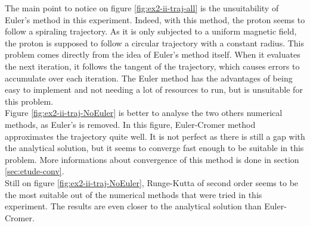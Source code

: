 \documentclass[a4paper,12pt,twoside]{article}
\begin{document}
The main point to notice on figure \ref{fig:ex2-ii-traj-all} is the unsuitability of Euler's method in this experiment.
Indeed, with this method, the proton seems to follow a spiraling trajectory.
As it is only subjected to a uniform magnetic field, the proton is supposed to follow a circular trajectory with a constant radius.
This problem comes directly from the idea of Euler's method itself.
When it evaluates the next iteration, it follows  the tangent of the trajectory, which causes errors to accumulate over each iteration.
The Euler method has the advantages of being easy to implement and not needing a lot of resources to run, but is unsuitable for this problem.\\

Figure \ref{fig:ex2-ii-traj-NoEuler} is better to analyse the two others numerical methods, as Euler's is removed.
In this figure, Euler-Cromer method approximates the trajectory quite well.
It is not perfect as there is still a gap with the analytical solution, but it seems to converge fast enough to be suitable in this problem.
More informations about convergence of this method is done in section \ref{sec:etude-conv}.\\

Still on figure \ref{fig:ex2-ii-traj-NoEuler}, Runge-Kutta of second order seems to be the most suitable out of the numerical methods that were tried in this experiment.
The results are even closer to the analytical solution than Euler-Cromer.
\end{document}
